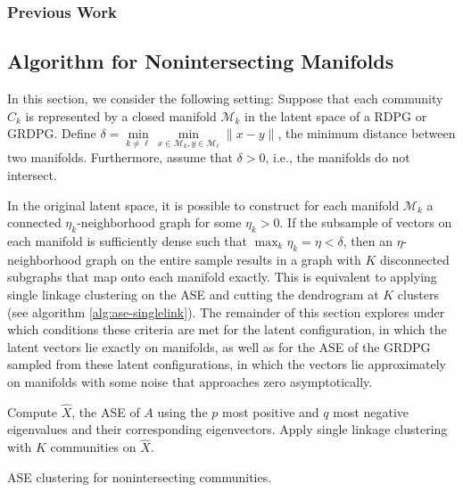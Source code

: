 \documentclass[
  11pt,
]{article}
\theoremstyle{definition}
\theoremstyle{definition}
\theoremstyle{definition}
\theoremstyle{definition}
\theoremstyle{remark}
\begin{document}
\hypertarget{previous-work-1}{%
\subsubsection{Previous Work}\label{previous-work-1}}

\hypertarget{sec:nonintersect}{%
\subsection{Algorithm for Nonintersecting Manifolds}\label{sec:nonintersect}}

In this section, we consider the following setting: Suppose that each community \(C_k\) is represented by a closed manifold \(\mathcal{M}_k\) in the latent space of a RDPG or GRDPG.
Define \(\delta = \min\limits_{k \neq \ell} \min\limits_{x \in \mathcal{M}_k, y \in \mathcal{M}_\ell} \|x - y\|\), the minimum distance between two manifolds.
Furthermore, assume that \(\delta > 0\), i.e., the manifolds do not intersect.

In the original latent space, it is possible to construct for each manifold \(\mathcal{M}_k\) a connected \(\eta_k\)-neighborhood graph for some \(\eta_k > 0\).
If the subsample of vectors on each manifold is sufficiently dense such that \(\max_k \eta_k = \eta < \delta\), then an \(\eta\)-neighborhood graph on the entire sample results in a graph with \(K\) disconnected subgraphs that map onto each manifold exactly.
This is equivalent to applying single linkage clustering on the ASE and cutting the dendrogram at \(K\) clusters (see algorithm \ref{alg:ase-singlelink}).
The remainder of this section explores under which conditions these criteria are met for the latent configuration, in which the latent vectors lie exactly on manifolds, as well as for the ASE of the GRDPG sampled from these latent configurations, in which the vectors lie approximately on manifolds with some noise that approaches zero asymptotically.

\begin{algorithm}[h]
  \label{alg:ase-singlelink}
  \DontPrintSemicolon
  \SetAlgoLined
  Compute $\hat{X}$, the ASE of $A$ using the $p$ most positive and $q$ most negative eigenvalues and their corresponding eigenvectors.\;
  Apply single linkage clustering with $K$ communities on $\hat{X}$.\;
  \caption{ASE clustering for nonintersecting communities.}
\end{algorithm}
\end{document}
